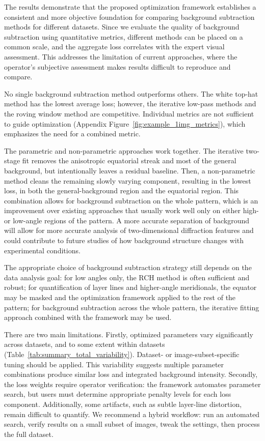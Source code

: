 \documentclass[journal,article,submit,moreauthors]{Definitions/mdpi}
\begin{document}
The results demonstrate that the proposed optimization framework establishes a consistent and more objective foundation for comparing background subtraction methods for different datasets. Since we evaluate the quality of background subtraction using quantitative metrics, different methods can be placed on a common scale, and the aggregate loss correlates with the expert visual assessment. This addresses the limitation of current approaches, where the operator's subjective assessment makes results difficult to reproduce and compare.

No single background subtraction method outperforms others. The white top-hat method has the lowest average loss; however, the iterative low-pass methods and the roving window method are competitive. Individual metrics are not sufficient to guide optimization (Appendix Figure~\ref{fig:example_1img_metrics}), which emphasizes the need for a combined metric.

The parametric and non-parametric approaches work together. The iterative two-stage fit removes the anisotropic equatorial streak and most of the general background, but intentionally leaves a residual baseline. Then, a non-parametric method cleans the remaining slowly varying component, resulting in the lowest loss, in both the general-background region and the equatorial region. This combination allows for background subtraction on the whole pattern, which is an improvement over existing approaches that usually work well only on either high- or low-angle regions of the pattern. A more accurate separation of background will allow for more accurate analysis of two-dimensional diffraction features and could contribute to future studies of how background structure changes with experimental conditions.

The appropriate choice of background subtraction strategy still depends on the data analysis goal: for low angles only, the RCH method is often sufficient and robust; for quantification of layer lines and higher-angle meridionals, the equator may be masked and the optimization framework applied to the rest of the pattern; for background subtraction across the whole pattern, the iterative fitting approach combined with the framework may be used.

There are two main limitations. Firstly, optimized parameters vary significantly across datasets, and to some extent within datasets (Table~\ref{tab:summary_total_variability}). Dataset- or image-subset-specific tuning should be applied. This variability suggests multiple parameter combinations produce similar loss and integrated background intensity. Secondly, the loss weights require operator verification: the framework automates parameter search, but users must determine appropriate penalty levels for each loss component. Additionally, some artifacts, such as subtle layer-line distortion, remain difficult to quantify. We recommend a hybrid workflow: run an automated search, verify results on a small subset of images, tweak the settings, then process the full dataset.
\end{document}
